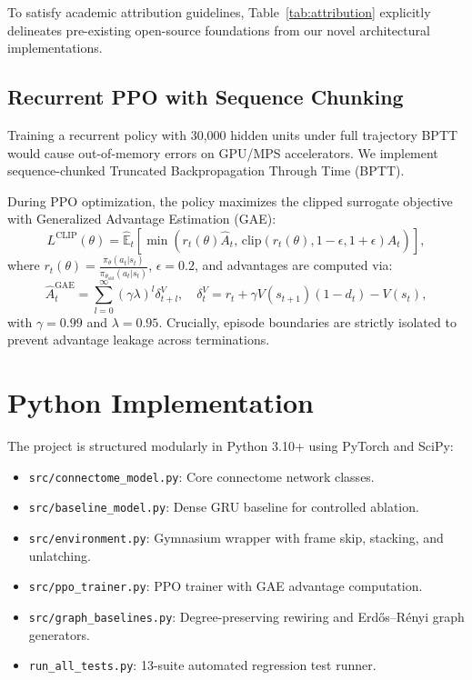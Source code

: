 \documentclass[10pt,twocolumn]{article}
\begin{document}
To satisfy academic attribution guidelines, Table~\ref{tab:attribution} explicitly delineates pre-existing open-source foundations from our novel architectural implementations.

\subsection{Recurrent PPO with Sequence Chunking}
Training a recurrent policy with 30,000 hidden units under full trajectory BPTT would cause out-of-memory errors on GPU/MPS accelerators. We implement sequence-chunked Truncated Backpropagation Through Time (BPTT).

During PPO optimization, the policy maximizes the clipped surrogate objective with Generalized Advantage Estimation (GAE):
\begin{equation}
    L^{\text{CLIP}}(\theta) = \hat{\mathbb{E}}_t \left[ \min\left( r_t(\theta)\hat{A}_t, \, \text{clip}(r_t(\theta), 1-\epsilon, 1+\epsilon)\hat{A}_t \right) \right],
\end{equation}
where $r_t(\theta) = \frac{\pi_\theta(a_t|s_t)}{\pi_{\theta_{\text{old}}}(a_t|s_t)}$, $\epsilon = 0.2$, and advantages are computed via:
\begin{equation}
    \hat{A}_t^{\text{GAE}} = \sum_{l=0}^\infty (\gamma \lambda)^l \delta_{t+l}^V, \quad \delta_t^V = r_t + \gamma V(s_{t+1})(1-d_t) - V(s_t),
\end{equation}
with $\gamma = 0.99$ and $\lambda = 0.95$. Crucially, episode boundaries are strictly isolated to prevent advantage leakage across terminations.

\section{Python Implementation}
\label{sec:implementation}

The project is structured modularly in Python 3.10+ using PyTorch and SciPy:
\begin{itemize}
    \item \texttt{src/connectome\_model.py}: Core connectome network classes.
    \item \texttt{src/baseline\_model.py}: Dense GRU baseline for controlled ablation.
    \item \texttt{src/environment.py}: Gymnasium wrapper with frame skip, stacking, and unlatching.
    \item \texttt{src/ppo\_trainer.py}: PPO trainer with GAE advantage computation.
    \item \texttt{src/graph\_baselines.py}: Degree-preserving rewiring and Erd\H{o}s--R\'enyi graph generators.
    \item \texttt{run\_all\_tests.py}: 13-suite automated regression test runner.
\end{itemize}
\end{document}
